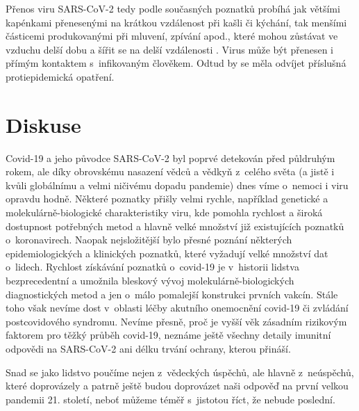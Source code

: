Přenos viru SARS-CoV-2 tedy podle současných poznatků probíhá jak většími kapénkami přenesenými na krátkou vzdálenost při kašli či kýchání, tak menšími částicemi produkovanými při mluvení, zpívání apod., které mohou zůstávat ve vzduchu delší dobu a šířit se na delší vzdálenosti \cite{Leung:2021}. Virus může být přenesen i přímým kontaktem s~infikovaným člověkem. Odtud by se měla odvíjet příslušná protiepidemická opatření.



\section*{Diskuse}
Covid-19 a jeho původce SARS-CoV-2 byl poprvé detekován před půldruhým rokem, ale díky obrovskému nasazení vědců a vědkyň z~celého světa (a jistě i kvůli globálnímu a velmi ničivému dopadu pandemie) dnes víme o~nemoci i viru opravdu hodně. Některé poznatky přišly velmi rychle, například genetické a molekulárně-biologické charakteristiky viru, kde pomohla rychlost a široká dostupnost potřebných metod a hlavně velké množství již existujících poznatků o~koronavirech. Naopak nejsložitější bylo přesné poznání některých epidemiologických a klinických poznatků, které vy\-ža\-du\-jí velké množství dat o~lidech. Rychlost získávání poznatků o~covid-19 je v~historii lidstva bezprecedentní a umožnila bleskový vývoj molekulárně-biologických diagnostických metod a jen o~málo pomalejší konstrukci prvních vakcín. Stále toho však nevíme dost v~oblasti léčby akutního onemocnění covid-19 či zvládání postcovidového syndromu. Nevíme přesně, proč je vyšší věk zásadním rizikovým faktorem pro těžký průběh covid-19, neznáme ještě všechny detaily imunitní odpovědi na SARS-CoV-2 ani délku trvání ochrany, kterou přináší.

Snad se jako lidstvo poučíme nejen z~vědeckých úspěchů, ale hlavně z~neúspěchů, které doprovázely a patrně ještě budou doprovázet naši odpověď na první velkou pandemii 21. století, neboť můžeme téměř s~jistotou říct, že nebude poslední.


